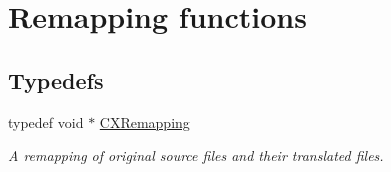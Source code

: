 \hypertarget{group__CINDEX__REMAPPING}{}\section{Remapping functions}
\label{group__CINDEX__REMAPPING}
\subsection*{Typedefs}
\begin{DoxyCompactItemize}
\item 
\mbox{\label{group__CINDEX__REMAPPING_ga04be0aca9e36a130cf1dd6fd8cbd4408}} 
typedef void $\ast$ \mbox{\hyperlink{group__CINDEX__REMAPPING_ga04be0aca9e36a130cf1dd6fd8cbd4408}{C\+X\+Remapping}}
\begin{DoxyCompactList}\small\item\em A remapping of original source files and their translated files. \end{DoxyCompactList}\end{DoxyCompactItemize}
